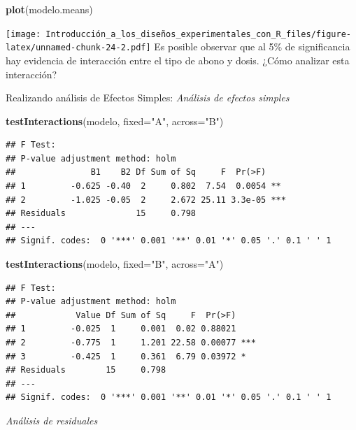 \documentclass[]{book}
\newenvironment{Shaded}{\begin{snugshade}}{\end{snugshade}}
\newcommand{\KeywordTok}[1]{\textcolor[rgb]{0.13,0.29,0.53}{\textbf{#1}}}
\newcommand{\DataTypeTok}[1]{\textcolor[rgb]{0.13,0.29,0.53}{#1}}
\newcommand{\StringTok}[1]{\textcolor[rgb]{0.31,0.60,0.02}{#1}}
\newcommand{\NormalTok}[1]{#1}
\begin{document}
\begin{Shaded}
\begin{Highlighting}[]
\KeywordTok{plot}\NormalTok{(modelo.means)}
\end{Highlighting}
\end{Shaded}

\texttt{[image: Introducción\_a\_los\_diseños\_experimentales\_con\_R\_files/figure-latex/unnamed-chunk-24-2.pdf]}
Es posible observar que al 5\% de significancia hay evidencia de
interacción entre el tipo de abono y dosis. ¿Cómo analizar esta
interacción?

Realizando análisis de Efectos Simples: \emph{Análisis de efectos
simples}

\begin{Shaded}
\begin{Highlighting}[]
\KeywordTok{testInteractions}\NormalTok{(modelo, }\DataTypeTok{fixed=}\StringTok{"A"}\NormalTok{, }\DataTypeTok{across=}\StringTok{"B"}\NormalTok{)}
\end{Highlighting}
\end{Shaded}

\begin{verbatim}
## F Test: 
## P-value adjustment method: holm
##               B1    B2 Df Sum of Sq     F  Pr(>F)    
## 1         -0.625 -0.40  2     0.802  7.54  0.0054 ** 
## 2         -1.025 -0.05  2     2.672 25.11 3.3e-05 ***
## Residuals              15     0.798                  
## ---
## Signif. codes:  0 '***' 0.001 '**' 0.01 '*' 0.05 '.' 0.1 ' ' 1
\end{verbatim}

\begin{Shaded}
\begin{Highlighting}[]
\KeywordTok{testInteractions}\NormalTok{(modelo, }\DataTypeTok{fixed=}\StringTok{"B"}\NormalTok{, }\DataTypeTok{across=}\StringTok{"A"}\NormalTok{)}
\end{Highlighting}
\end{Shaded}

\begin{verbatim}
## F Test: 
## P-value adjustment method: holm
##            Value Df Sum of Sq     F  Pr(>F)    
## 1         -0.025  1     0.001  0.02 0.88021    
## 2         -0.775  1     1.201 22.58 0.00077 ***
## 3         -0.425  1     0.361  6.79 0.03972 *  
## Residuals        15     0.798                  
## ---
## Signif. codes:  0 '***' 0.001 '**' 0.01 '*' 0.05 '.' 0.1 ' ' 1
\end{verbatim}

\emph{Análisis de residuales}
\end{document}
